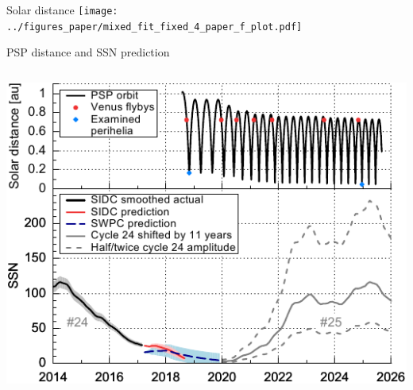 \begin{frame}[c]{Solar distance}{}
	\centering
	\texttt{[image: ../figures\_paper/mixed\_fit\_fixed\_4\_paper\_f\_plot.pdf]}
\end{frame}

\begin{frame}[c]{PSP distance and SSN prediction}{}
	\begin{columns}[c]
		
		\includegraphics[width=\textwidth]{../figures_paper/SPP_orbit_predicted_SSN_overview_f_plot.pdf}


	\end{columns}
\end{frame}
